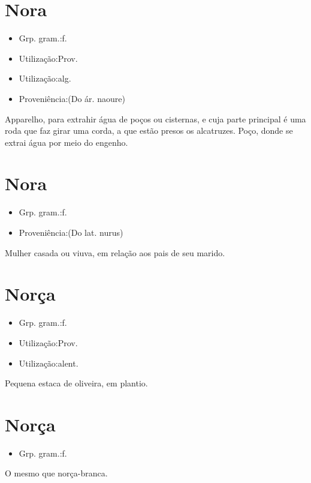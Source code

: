 \section{Nora}
\begin{itemize}
\item {Grp. gram.:f.}
\end{itemize}
\begin{itemize}
\item {Utilização:Prov.}
\end{itemize}
\begin{itemize}
\item {Utilização:alg.}
\end{itemize}
\begin{itemize}
\item {Proveniência:(Do ár. \textunderscore naoure\textunderscore )}
\end{itemize}
Apparelho, para extrahir água de poços ou cisternas, e cuja parte principal é uma roda que faz girar uma corda, a que estão presos os alcatruzes.
Poço, donde se extrai água por meio do engenho.
\section{Nora}
\begin{itemize}
\item {Grp. gram.:f.}
\end{itemize}
\begin{itemize}
\item {Proveniência:(Do lat. \textunderscore nurus\textunderscore )}
\end{itemize}
Mulher casada ou viuva, em relação aos pais de seu marido.
\section{Norça}
\begin{itemize}
\item {Grp. gram.:f.}
\end{itemize}
\begin{itemize}
\item {Utilização:Prov.}
\end{itemize}
\begin{itemize}
\item {Utilização:alent.}
\end{itemize}
Pequena estaca de oliveira, em plantio.
\section{Norça}
\begin{itemize}
\item {Grp. gram.:f.}
\end{itemize}
O mesmo que \textunderscore norça-branca\textunderscore .
